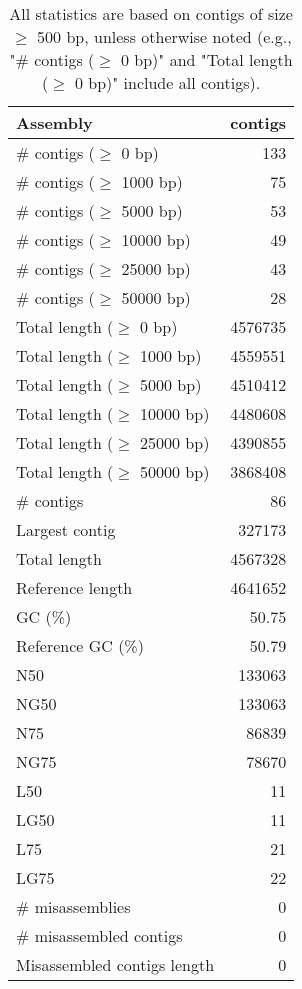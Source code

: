 \documentclass[12pt,a4paper]{article}
\begin{document}
\begin{table}[ht]
\begin{center}
\caption{All statistics are based on contigs of size $\geq$ 500 bp, unless otherwise noted (e.g., "\# contigs ($\geq$ 0 bp)" and "Total length ($\geq$ 0 bp)" include all contigs).}
\begin{tabular}{|l*{1}{|r}|}
\hline
Assembly & contigs \\ \hline
\# contigs ($\geq$ 0 bp) & 133 \\ \hline
\# contigs ($\geq$ 1000 bp) & 75 \\ \hline
\# contigs ($\geq$ 5000 bp) & 53 \\ \hline
\# contigs ($\geq$ 10000 bp) & 49 \\ \hline
\# contigs ($\geq$ 25000 bp) & 43 \\ \hline
\# contigs ($\geq$ 50000 bp) & 28 \\ \hline
Total length ($\geq$ 0 bp) & 4576735 \\ \hline
Total length ($\geq$ 1000 bp) & 4559551 \\ \hline
Total length ($\geq$ 5000 bp) & 4510412 \\ \hline
Total length ($\geq$ 10000 bp) & 4480608 \\ \hline
Total length ($\geq$ 25000 bp) & 4390855 \\ \hline
Total length ($\geq$ 50000 bp) & 3868408 \\ \hline
\# contigs & 86 \\ \hline
Largest contig & 327173 \\ \hline
Total length & 4567328 \\ \hline
Reference length & 4641652 \\ \hline
GC (\%) & 50.75 \\ \hline
Reference GC (\%) & 50.79 \\ \hline
N50 & 133063 \\ \hline
NG50 & 133063 \\ \hline
N75 & 86839 \\ \hline
NG75 & 78670 \\ \hline
L50 & 11 \\ \hline
LG50 & 11 \\ \hline
L75 & 21 \\ \hline
LG75 & 22 \\ \hline
\# misassemblies & 0 \\ \hline
\# misassembled contigs & 0 \\ \hline
Misassembled contigs length & 0 \\ \hline

\end{tabular}
\end{center}
\end{table}
\end{document}
